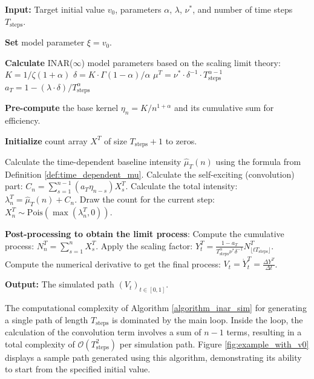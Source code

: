 \documentclass[letterpaper]{article}
\numberwithin{equation}{section}
\theoremstyle{definition}
\theoremstyle{remark}
\begin{document}
\begin{algorithm}[h]
  \caption{Simulation of a fractional CIR process via the cumulative INAR($\infty$) approximation}
  \label{algorithm_inar_sim}
  \begin{algorithmic}[1]
  \STATE \textbf{Input:} Target initial value $v_0$, parameters $\alpha$, $\lambda$, $\nu^*$, and number of time steps $T_{\text{steps}}$.
  
  \STATE \textbf{Set} model parameter $\xi = v_0$.
  
  \STATE \textbf{Calculate} INAR($\infty$) model parameters based on the scaling limit theory:
  \STATE \quad $K = 1 / \zeta(1 + \alpha)$
  \STATE \quad $\delta = K \cdot \Gamma(1 - \alpha) / \alpha$
  \STATE \quad $\mu^T = \nu^* \cdot \delta^{-1} \cdot T_{\text{steps}}^{\alpha - 1}$
  \STATE \quad $a_T = 1 - (\lambda \cdot \delta) / T_{\text{steps}}^\alpha$
  
  \STATE \textbf{Pre-compute} the base kernel $\eta_n = K / n^{1+\alpha}$ and its cumulative sum for efficiency.
  
  \STATE \textbf{Initialize} count array $X^T$ of size $T_{\text{steps}}+1$ to zeros.
  
      \STATE Calculate the time-dependent baseline intensity $\hat{\mu}_T(n)$ using the formula from Definition \ref{def:time_dependent_mu}.
      \STATE Calculate the self-exciting (convolution) part: $C_n = \sum_{s=1}^{n-1} (a_T \eta_{n-s}) X_s^T$.
      \STATE Calculate the total intensity: $\lambda_n^T = \hat{\mu}_T(n) + C_n$.
      \STATE Draw the count for the current step: $X_n^T \sim \text{Pois}(\max(\lambda_n^T, 0))$.
  \ENDFOR
  
  \STATE \textbf{Post-processing to obtain the limit process}:
  \STATE Compute the cumulative process: $N^T_n = \sum_{s=1}^n X_s^T$.
  \STATE Apply the scaling factor: $Y_t^T = \frac{1 - a_T}{T_{\text{steps}}^\alpha \nu^* \delta^{-1}} N^T_{\lfloor t T_{\text{steps}} \rfloor}$.
  \STATE Compute the numerical derivative to get the final process: $V_t = \dot{Y}_t^T = \frac{\Delta Y^T}{\Delta t}$.
  
  \STATE \textbf{Output:} The simulated path $(V_t)_{t \in [0,1]}$.
  \end{algorithmic}
\end{algorithm}

The computational complexity of Algorithm \ref{algorithm_inar_sim} for generating a single path of length $T_{\text{steps}}$ is dominated by the main loop. Inside the loop, the calculation of the convolution term involves a sum of $n-1$ terms, resulting in a total complexity of $\mathcal{O}(T_{\text{steps}}^2)$ per simulation path. Figure \ref{fig:example_with_v0} displays a sample path generated using this algorithm, demonstrating its ability to start from the specified initial value.
\end{document}
